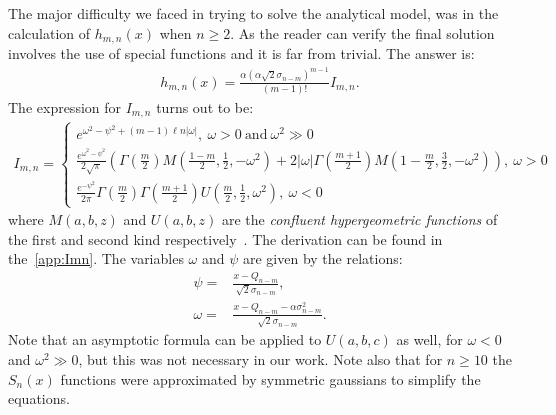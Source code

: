 \documentclass[preprint,12pt]{elsarticle}
\begin{document}
The major difficulty we faced in trying to solve the analytical model, was in the calculation of $h_{m,n}(x)$ when $n\geq2$. 
As the reader can verify the final solution involves the use of special functions and it is far from trivial. 
The answer is:
\begin{align}
h_{m,n}(x) =  \frac{\alpha (\alpha\sqrt{2} \sigma_{n-m})^{m-1}}{(m-1)!}  I_{m,n}.
\end{align}  
The expression for $I_{m,n}$ turns out to be:
\begin{align}
I_{m,n} = 
\begin{cases}
  e^{\omega^2 - \psi^2 + (m-1) \ell n |\omega|}, \ \omega>0 \ \text{and} \  \omega^2 \gg 0\\
\frac{ e^{\omega^2 -\psi^2 } }{ 2\sqrt{\pi} }\left( \Gamma\left( \frac{m}{2} \right) M\left(\frac{1-m}{2}, \frac{1}{2}, -\omega^2 \right)  
+ 2|\omega| \Gamma\left( \frac{m+1}{2} \right) M\left(1-\frac{m}{2}, \frac{3}{2}, -\omega^2 \right)       \right), \ \omega > 0  \\
\frac{ e^{ -\psi^2 } }{2\pi}   \Gamma\left( \frac{m}{2} \right)   \Gamma\left( \frac{m+1}{2} \right) U\left( \frac{m}{2}, \frac{1}{2}, \omega^2  \right), \ \omega<0
\end{cases}
\nonumber
\end{align} 
where $M(a,b,z)$ and $U(a,b,z)$ are the \emph{confluent hypergeometric functions} of the first and second kind respectively~\cite{error}. 
The derivation can be found in the~\ref{app:Imn}. 
The variables $\omega$ and $\psi$ are given by the relations:
\begin{align}
\psi = & \frac{x-Q_{n-m}}{\sqrt{2}\sigma_{n-m}}, \\
\omega = & \frac{x-Q_{n-m} -\alpha\sigma^2_{n-m}}{\sqrt{2}\sigma_{n-m}}.
\end{align}  
Note that an asymptotic formula can be applied to $U(a,b,c)$ as well, for $\omega < 0$ and $\omega^2 \gg 0$, but this was not necessary in our work. 
Note also that for $n\geq10$ the $S_n(x)$ functions were approximated by symmetric gaussians to simplify the equations. 
\end{document}

